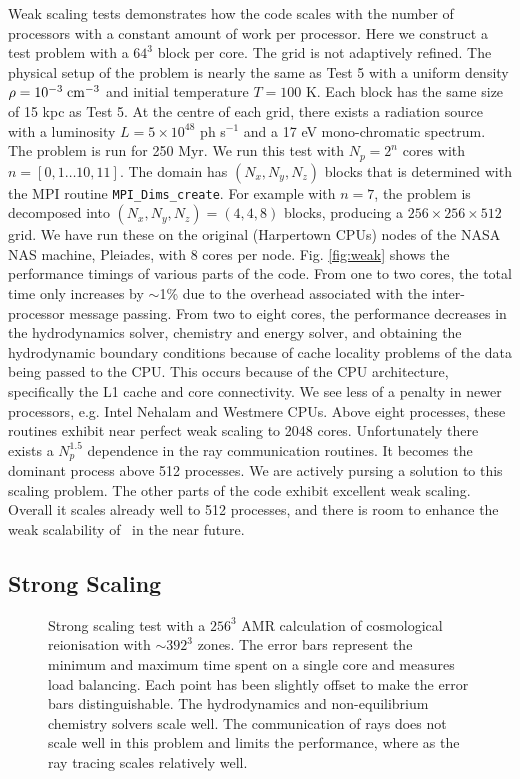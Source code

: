\documentclass[useAMS,usenatbib]{mn2e}
\begin{document}
Weak scaling tests demonstrates how the code scales with the number of
processors with a constant amount of work per processor.  Here we
construct a test problem with a $64^3$ block per core.  The grid is
not adaptively refined.  The physical setup of the problem is nearly
the same as Test 5 with a uniform density $\rho = 10^{-3} \;\cubecm$
and initial temperature $T = 100$ K.  Each block has the same size of
15 kpc as Test 5.  At the centre of each grid, there exists a
radiation source with a luminosity $L = 5 \times 10^{48}$ ph s$^{-1}$
and a 17 eV mono-chromatic spectrum.  The problem is run for 250 Myr.
We run this test with $N_p = 2^n$ cores with $n = [0,1 \dots 10,11]$.
The domain has $(N_x, N_y, N_z)$ blocks that is determined with the
MPI routine \texttt{MPI\_Dims\_create}.  For example with $n = 7$, the
problem is decomposed into $(N_x, N_y, N_z) = (4,4,8)$ blocks,
producing a $256 \times 256 \times 512$ grid.  We have run these on
the original (Harpertown CPUs) nodes of the NASA NAS machine,
Pleiades, with 8 cores per node.  Fig. \ref{fig:weak} shows the
performance timings of various parts of the code.  From one to two
cores, the total time only increases by $\sim$1\% due to the overhead
associated with the inter-processor message passing.  From two to
eight cores, the performance decreases in the hydrodynamics solver,
chemistry and energy solver, and obtaining the hydrodynamic boundary
conditions because of cache locality problems of the data being passed
to the CPU.  This occurs because of the CPU architecture, specifically
the L1 cache and core connectivity.  We see less of a penalty in newer
processors, e.g. Intel Nehalam and Westmere CPUs.  Above eight
processes, these routines exhibit near perfect weak scaling to 2048
cores.  Unfortunately there exists a $N_p^{1.5}$ dependence in the ray
communication routines.  It becomes the dominant process above 512
processes.  We are actively pursing a solution to this scaling
problem.  The other parts of the code exhibit excellent weak scaling.
Overall it scales already well to 512 processes, and there is room to
enhance the weak scalability of \moray~in the near future.

\subsection{Strong Scaling}
\label{sec:strong_sc}

\begin{figure}
  \caption{\label{fig:strong} Strong scaling test with a $256^3$ AMR
    calculation of cosmological reionisation with $\sim392^3$ zones.
    The error bars represent the minimum and maximum time spent on a
    single core and measures load balancing.  Each point has been
    slightly offset to make the error bars distinguishable.  The
    hydrodynamics and non-equilibrium chemistry solvers scale well.
    The communication of rays does not scale well in this problem and
    limits the performance, where as the ray tracing scales relatively
    well.}
\end{figure}
\end{document}
